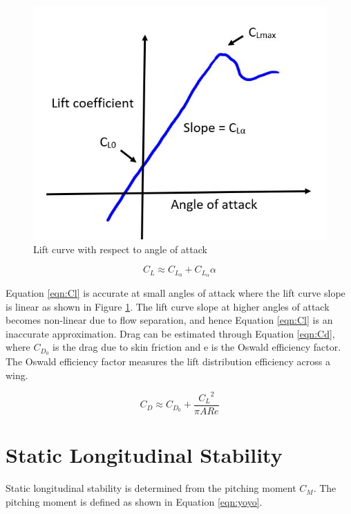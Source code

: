 \begin{figure}[H]
    \centering
    \includegraphics[scale = 0.6]{02_Background/Figs/liftcurveslope.JPG}
    \caption{Lift curve with respect to angle of attack}
    \label{fig:Clalpha}
\end{figure}

\begin{equation}
    C_L \approx C_{L_0} + C_{L_\alpha}\alpha
    \label{eqn:Cl}
\end{equation}

Equation \ref{eqn:Cl} is accurate at small angles of attack where the lift curve slope is linear as shown in Figure \ref{fig:Clalpha}. The lift curve slope at higher angles of attack becomes non-linear due to flow separation, and hence Equation \ref{eqn:Cl} is an inaccurate approximation. Drag can be estimated through Equation \ref{eqn:Cd}, where $C_{D_0}$ is the drag due to skin friction and \acrshort{e} is the Oswald efficiency factor. The Oswald efficiency factor measures the lift distribution efficiency across a wing. 


\begin{equation}
    C_D \approx C_{D_0} + \frac{{C_L}^2}{\pi ARe}
    \label{eqn:Cd}
\end{equation}



\section{Static Longitudinal Stability}

Static longitudinal stability is determined from the pitching moment $C_M$. The pitching moment is defined as shown in Equation \ref{eqn:yoyo}.

